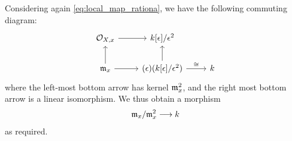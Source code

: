 \documentclass[12pt]{article}
\numberwithin{thm}{subsection}
\numberwithin{defn}{subsection}
\numberwithin{lemma}{subsection}
\numberwithin{example}{subsection}
\numberwithin{notation}{subsection}
\numberwithin{cor}{subsection}
\numberwithin{remark}{subsection}
\numberwithin{condition}{subsection}
\numberwithin{question}{subsection}
\numberwithin{construction}{subsection}
\numberwithin{construction}{subsection}
\numberwithin{construction}{subsection}
\newcommand{\lto}{\longrightarrow}
\begin{document}
Considering again \eqref{eq:local_map_rationa}, we have the following commuting diagram:
\[\begin{tikzcd}
	{\mathcal{O}_{X,x}} & {k[\epsilon]/\epsilon^2} \\
	{\frak{m}_x} & {(\epsilon)(k[\epsilon]/\epsilon^2)} & k
	\arrow[from=1-1, to=1-2]
	\arrow[from=2-1, to=1-1]
	\arrow[from=2-1, to=2-2]
	\arrow[from=2-2, to=1-2]
	\arrow["\cong", from=2-2, to=2-3]
\end{tikzcd}\]
where the left-most bottom arrow has kernel $\frak{m}_x^2$, and the right most bottom arrow is a linear isomorphism. We thus obtain a morphism
\begin{equation}
    \frak{m}_x/\frak{m}_x^2 \lto k
\end{equation}
as required.
\end{document}
